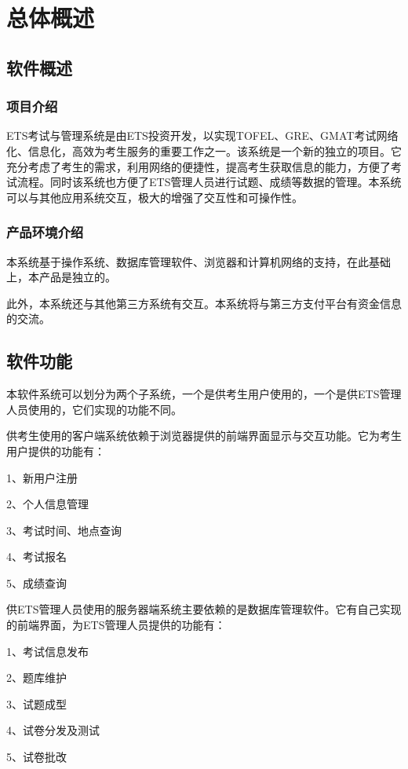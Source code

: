 \chapter{总体概述}

\section{软件概述}

\subsection{项目介绍}
ETS考试与管理系统是由ETS投资开发，以实现TOFEL、GRE、GMAT考试网络化、信息化，高效为考生服务的重要工作之一。该系统是一个新的独立的项目。它充分考虑了考生的需求，利用网络的便捷性，提高考生获取信息的能力，方便了考试流程。同时该系统也方便了ETS管理人员进行试题、成绩等数据的管理。本系统可以与其他应用系统交互，极大的增强了交互性和可操作性。

\subsection{产品环境介绍}
本系统基于操作系统、数据库管理软件、浏览器和计算机网络的支持，在此基础上，本产品是独立的。

此外，本系统还与其他第三方系统有交互。本系统将与第三方支付平台有资金信息的交流。

\section{软件功能}
本软件系统可以划分为两个子系统，一个是供考生用户使用的，一个是供ETS管理人员使用的，它们实现的功能不同。

供考生使用的客户端系统依赖于浏览器提供的前端界面显示与交互功能。它为考生用户提供的功能有：

1、新用户注册

2、个人信息管理

3、考试时间、地点查询

4、考试报名

5、成绩查询

供ETS管理人员使用的服务器端系统主要依赖的是数据库管理软件。它有自己实现的前端界面，为ETS管理人员提供的功能有：

1、考试信息发布

2、题库维护

3、试题成型

4、试卷分发及测试

5、试卷批改

